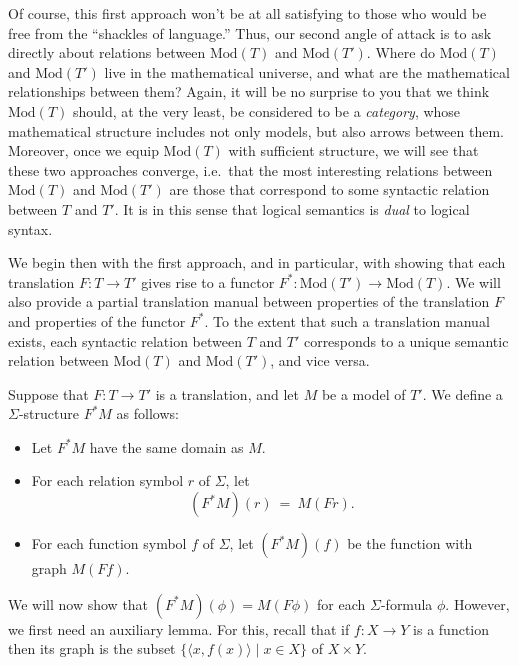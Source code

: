 Of course, this first approach won't be at all satisfying to those who
would be free from the ``shackles of language.''  Thus, our second
angle of attack is to ask directly about relations between
$\mathrm{Mod}(T)$ and $\mathrm{Mod}(T')$.  Where do $\mathrm{Mod}(T)$
and $\mathrm{Mod}(T')$ live in the mathematical universe, and what are
the mathematical relationships between them?  Again, it will be no
surprise to you that we think $\mathrm{Mod}(T)$ should, at the very
least, be considered to be a {\it category}, whose mathematical
structure includes not only models, but also arrows between them.
Moreover, once we equip $\mathrm{Mod}(T)$ with sufficient structure,
we will see that these two approaches converge, i.e.\ that the most
interesting relations between $\mathrm{Mod}(T)$ and $\mathrm{Mod}(T')$
are those that correspond to some syntactic relation between $T$ and
$T'$.  It is in this sense that logical semantics is {\it dual} to
logical syntax.

We begin then with the first approach, and in particular, with showing
that each translation $F:T\to T'$ gives rise to a functor
$F^*:\mathrm{Mod}(T')\to \mathrm{Mod}(T)$.  We will also provide a
partial translation manual between properties of the translation $F$
and properties of the functor $F^*$.  To the extent that such a
translation manual exists, each syntactic relation between $T$ and
$T'$ corresponds to a unique semantic relation between
$\mathrm{Mod}(T)$ and $\mathrm{Mod}(T')$, and vice versa.

\begin{defn} Suppose that $F:T\to T'$ is a translation, and let $M$ be
  a model of $T'$.  We define a $\Sigma$-structure $F^*M$ as follows:
  \begin{itemize}
  \item Let $F^*M$ have the same domain as $M$.
  \item For each relation symbol $r$ of $\Sigma$, let
    \[ (F^*M)(r) \: = \: M(Fr) .\]
  \item For each function symbol $f$ of $\Sigma$, let $(F^*M)(f)$ be
    the function with graph $M(Ff)$.  \end{itemize} \end{defn}

We will now show that $(F^*M)(\phi )=M(F\phi )$ for each
$\Sigma$-formula $\phi$.  However, we first need an auxiliary lemma.
For this, recall that if $f:X\to Y$ is a function then its graph is
the subset $\{ \langle x,f(x)\rangle \mid x\in X\}$ of $X\times Y$.

